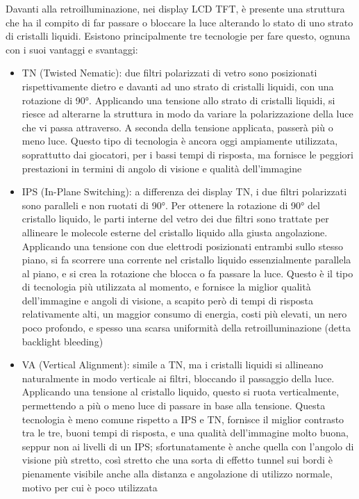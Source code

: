 Davanti alla retroilluminazione, nei display LCD TFT, è presente una struttura che ha il compito di far passare o bloccare la luce alterando lo stato di uno strato di cristalli liquidi. Esistono principalmente tre tecnologie per fare questo, ognuna con i suoi vantaggi e svantaggi:
\begin{itemize}
	\item TN (Twisted Nematic): due filtri polarizzati di vetro sono posizionati rispettivamente dietro e davanti ad uno strato di cristalli liquidi, con una rotazione di 90°. Applicando una tensione allo strato di cristalli liquidi, si riesce ad alterarne la struttura in modo da variare la polarizzazione della luce che vi passa attraverso. A seconda della tensione applicata, passerà più o meno luce. Questo tipo di tecnologia è ancora oggi ampiamente utilizzata, soprattutto dai giocatori, per i bassi tempi di risposta, ma fornisce le peggiori prestazioni in termini di angolo di visione e qualità dell'immagine
	\item IPS (In-Plane Switching): a differenza dei display TN, i due filtri polarizzati sono paralleli e non ruotati di 90°. Per ottenere la rotazione di 90° del cristallo liquido, le parti interne del vetro dei due filtri sono trattate per allineare le molecole esterne del cristallo liquido alla giusta angolazione. Applicando una tensione con due elettrodi posizionati entrambi sullo stesso piano, si fa scorrere una corrente nel cristallo liquido essenzialmente parallela al piano, e si crea la rotazione che blocca o fa passare la luce. Questo è il tipo di tecnologia più utilizzata al momento, e fornisce la miglior qualità dell'immagine e angoli di visione, a scapito però di tempi di risposta relativamente alti, un maggior consumo di energia, costi più elevati, un nero poco profondo, e spesso una scarsa uniformità della retroilluminazione (detta backlight bleeding)
	\item VA (Vertical Alignment): simile a TN, ma i cristalli liquidi si allineano naturalmente in modo verticale ai filtri, bloccando il passaggio della luce. Applicando una tensione al cristallo liquido, questo si ruota verticalmente, permettendo a più o meno luce di passare in base alla tensione. Questa tecnologia è meno comune rispetto a IPS e TN, fornisce il miglior contrasto tra le tre, buoni tempi di risposta, e una qualità dell'immagine molto buona, seppur non ai livelli di un IPS; sfortunatamente è anche quella con l'angolo di visione più stretto, così stretto che una sorta di effetto tunnel sui bordi è pienamente visibile anche alla distanza e angolazione di utilizzo normale, motivo per cui è poco utilizzata
\end{itemize}

